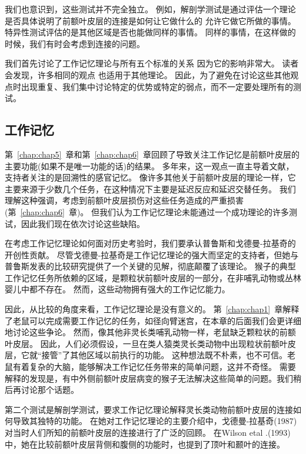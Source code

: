 我们也意识到，这些测试并不完全独立。
例如，解剖学测试是通过评估一个理论是否具体说明了前额叶皮层的连接是如何让它做什么的 允许它做它所做的事情。
特异性测试评估的是其他区域是否也能做同样的事情。
同样的事情，在这样做的时候，我们有时会考虑到连接的问题。
\par


我们首先讨论了工作记忆理论与所有五个标准的关系 因为它的影响非常大。
读者会发现，许多相同的观点 也适用于其他理论。
因此，为了避免在讨论这些其他观点时出现重复、我们集中讨论特定的优势或特定的弱点，而不一定要处理所有的测试。



\subsection{工作记忆}

第~\ref{chap:chap5}~章和第~\ref{chap:chap6}~章回顾了导致关注工作记忆是前额叶皮层的主要功能(如果不是唯一功能的话)的结果\cite{goldman2011circuitry}。
多年来，这一观点一直主导着文献，支持者关注的是回溯性的感官记忆。
像许多其他关于前额叶皮层的理论一样，它主要来源于少数几个任务，在这种情况下主要是延迟反应和延迟交替任务。
我们理解这种强调，考虑到前额叶皮层损伤对这些任务造成的严重损害(第~\ref{chap:chap6}~章)。
但我们认为工作记忆理论未能通过一个成功理论的许多测试，因此我们现在依次讨论这些缺陷。
\par


在考虑工作记忆理论如何面对历史考验时，我们要承认普鲁斯和戈德曼-拉基奇\cite{preuss1991myelo,preuss1991ipsilateral}的开创性贡献。
尽管戈德曼-拉基奇是工作记忆理论的强大而坚定的支持者，但她与普鲁斯发表的比较研究提供了一个关键的见解，彻底颠覆了该理论。
猴子的典型工作记忆任务所依赖的区域，是颗粒状前额叶皮层的一部分，在非哺乳动物或丛林婴儿中都不存在。
然而，这些动物拥有强大的工作记忆能力。
\par


因此，从比较的角度来看，工作记忆理论是没有意义的。
第~\ref{chap:chap1}~章解释了老鼠可以完成需要工作记忆的任务，如径向臂迷宫，在本章的后面我们会更详细地讨论这些争论。
然而，像其他非灵长类哺乳动物一样，老鼠缺乏颗粒状的前额叶皮层。
因此，人们必须假设，一旦在类人猿类灵长类动物中出现粒状前额叶皮层，它就“接管”了其他区域以前执行的功能。
这种想法既不朴素，也不可信。老鼠有着复杂的大脑，能够解决工作记忆任务带来的简单问题，这并不奇怪。
需要解释的发现是，有中外侧前额叶皮层病变的猴子无法解决这些简单的问题。我们稍后再讨论那个话题。
\par


第二个测试是解剖学测试，要求工作记忆理论解释灵长类动物前额叶皮层的连接如何导致其独特的功能。
在她对工作记忆理论的主要介绍中，戈德曼-拉基奇(1987)对当时人们所知的前额叶皮层的连接进行了广泛的回顾。
在Wilson etal .(1993)中，她在比较前额叶皮层背侧和腹侧的功能时，也提到了顶叶和颞叶的连接。
\par


